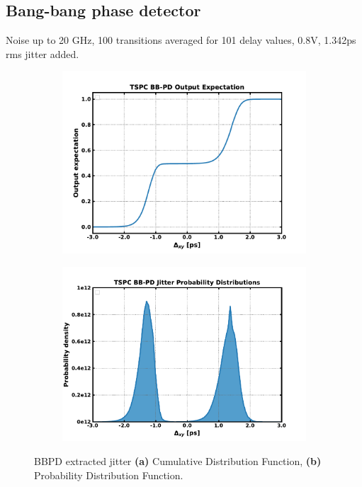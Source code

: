 \subsection{Bang-bang phase detector}
Noise up to 20 GHz, 100 transitions averaged for 101 delay values, 0.8V, 1.342ps rms jitter added.

	\begin{figure}[htb!]
	    \centering
	    \begin{subfigure}{0.5\textwidth}
	        \centering
	        \includegraphics[width=1\textwidth, angle=0]{./figs/results/cdf}
	        \caption{ }
	        \label{fig:bbpd_cdf}
	    \end{subfigure}%
	    \begin{subfigure}{0.5\textwidth}
	        \centering
	        \includegraphics[width=1\textwidth, angle=0]{./figs/results/pdf}
	        \caption{ }
	        \label{fig:bbpd_pdf}
	    \end{subfigure}
	    \label{fig:bbpd_jitter_dist}
	    \caption{BBPD extracted jitter \textbf{(a)} Cumulative Distribution Function, \textbf{(b)} Probability Distribution Function.}
	\end{figure} 

